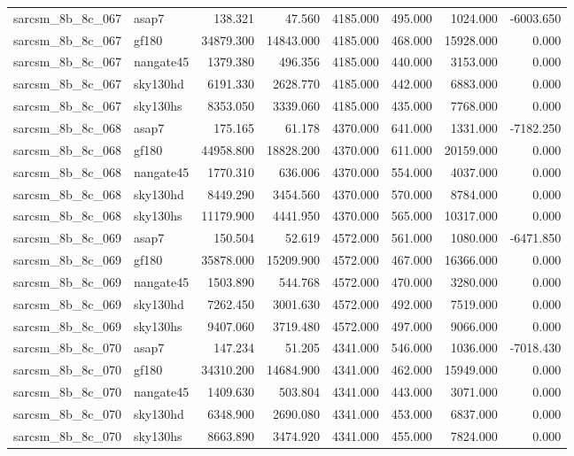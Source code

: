 \begin{tabular}{llrrrrrr}
sarcsm\_8b\_8c\_067 & asap7 & 138.321 & 47.560 & 4185.000 & 495.000 & 1024.000 & -6003.650 \\
sarcsm\_8b\_8c\_067 & gf180 & 34879.300 & 14843.000 & 4185.000 & 468.000 & 15928.000 & 0.000 \\
sarcsm\_8b\_8c\_067 & nangate45 & 1379.380 & 496.356 & 4185.000 & 440.000 & 3153.000 & 0.000 \\
sarcsm\_8b\_8c\_067 & sky130hd & 6191.330 & 2628.770 & 4185.000 & 442.000 & 6883.000 & 0.000 \\
sarcsm\_8b\_8c\_067 & sky130hs & 8353.050 & 3339.060 & 4185.000 & 435.000 & 7768.000 & 0.000 \\
sarcsm\_8b\_8c\_068 & asap7 & 175.165 & 61.178 & 4370.000 & 641.000 & 1331.000 & -7182.250 \\
sarcsm\_8b\_8c\_068 & gf180 & 44958.800 & 18828.200 & 4370.000 & 611.000 & 20159.000 & 0.000 \\
sarcsm\_8b\_8c\_068 & nangate45 & 1770.310 & 636.006 & 4370.000 & 554.000 & 4037.000 & 0.000 \\
sarcsm\_8b\_8c\_068 & sky130hd & 8449.290 & 3454.560 & 4370.000 & 570.000 & 8784.000 & 0.000 \\
sarcsm\_8b\_8c\_068 & sky130hs & 11179.900 & 4441.950 & 4370.000 & 565.000 & 10317.000 & 0.000 \\
sarcsm\_8b\_8c\_069 & asap7 & 150.504 & 52.619 & 4572.000 & 561.000 & 1080.000 & -6471.850 \\
sarcsm\_8b\_8c\_069 & gf180 & 35878.000 & 15209.900 & 4572.000 & 467.000 & 16366.000 & 0.000 \\
sarcsm\_8b\_8c\_069 & nangate45 & 1503.890 & 544.768 & 4572.000 & 470.000 & 3280.000 & 0.000 \\
sarcsm\_8b\_8c\_069 & sky130hd & 7262.450 & 3001.630 & 4572.000 & 492.000 & 7519.000 & 0.000 \\
sarcsm\_8b\_8c\_069 & sky130hs & 9407.060 & 3719.480 & 4572.000 & 497.000 & 9066.000 & 0.000 \\
sarcsm\_8b\_8c\_070 & asap7 & 147.234 & 51.205 & 4341.000 & 546.000 & 1036.000 & -7018.430 \\
sarcsm\_8b\_8c\_070 & gf180 & 34310.200 & 14684.900 & 4341.000 & 462.000 & 15949.000 & 0.000 \\
sarcsm\_8b\_8c\_070 & nangate45 & 1409.630 & 503.804 & 4341.000 & 443.000 & 3071.000 & 0.000 \\
sarcsm\_8b\_8c\_070 & sky130hd & 6348.900 & 2690.080 & 4341.000 & 453.000 & 6837.000 & 0.000 \\
sarcsm\_8b\_8c\_070 & sky130hs & 8663.890 & 3474.920 & 4341.000 & 455.000 & 7824.000 & 0.000 \\

\end{tabular}
